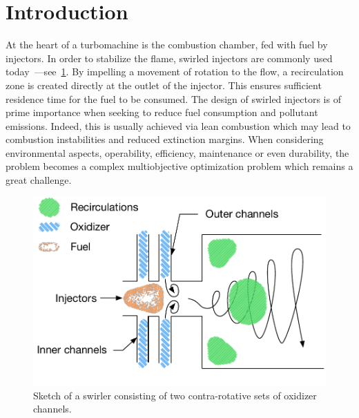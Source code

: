 \section{Introduction}\label{sec:intro}

At the heart of a turbomachine is the combustion chamber, fed with fuel by injectors. In order to stabilize the flame,  swirled injectors are commonly used today~\cite{Lilley1977}---see~\cref{fig:sketch-swirler}. By impelling a movement of rotation to the flow, a recirculation zone is created directly at the outlet of the injector. This ensures sufficient residence time for the fuel to be consumed. The design of swirled injectors is of prime importance when seeking to reduce fuel consumption and pollutant emissions. Indeed, this is usually achieved via lean combustion which may lead to combustion instabilities and reduced extinction margins. When considering environmental aspects, operability, efficiency, maintenance or even durability, the problem becomes a complex multiobjective optimization problem which remains a great challenge.

\begin{figure}[!ht]
\centering
\includegraphics[width=\linewidth,keepaspectratio]{fig/applications/swirler/sketch_swirler.pdf}
\caption{Sketch of a swirler consisting of two contra-rotative sets of oxidizer channels.}
\label{fig:sketch-swirler}
\end{figure}

